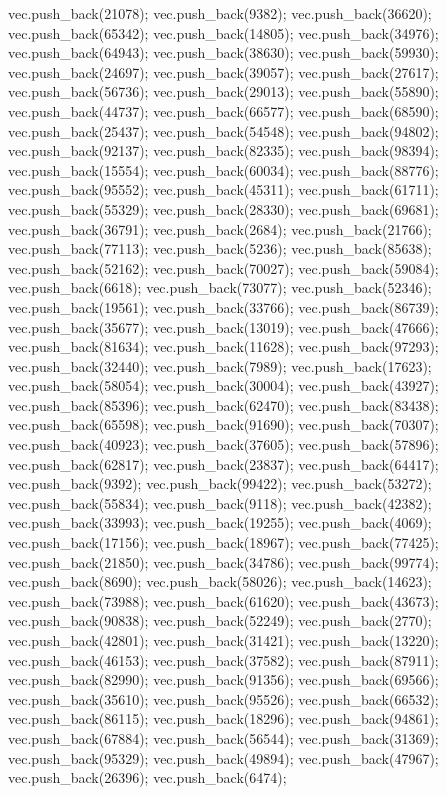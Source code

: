 vec.push_back(21078);
vec.push_back(9382);
vec.push_back(36620);
vec.push_back(65342);
vec.push_back(14805);
vec.push_back(34976);
vec.push_back(64943);
vec.push_back(38630);
vec.push_back(59930);
vec.push_back(24697);
vec.push_back(39057);
vec.push_back(27617);
vec.push_back(56736);
vec.push_back(29013);
vec.push_back(55890);
vec.push_back(44737);
vec.push_back(66577);
vec.push_back(68590);
vec.push_back(25437);
vec.push_back(54548);
vec.push_back(94802);
vec.push_back(92137);
vec.push_back(82335);
vec.push_back(98394);
vec.push_back(15554);
vec.push_back(60034);
vec.push_back(88776);
vec.push_back(95552);
vec.push_back(45311);
vec.push_back(61711);
vec.push_back(55329);
vec.push_back(28330);
vec.push_back(69681);
vec.push_back(36791);
vec.push_back(2684);
vec.push_back(21766);
vec.push_back(77113);
vec.push_back(5236);
vec.push_back(85638);
vec.push_back(52162);
vec.push_back(70027);
vec.push_back(59084);
vec.push_back(6618);
vec.push_back(73077);
vec.push_back(52346);
vec.push_back(19561);
vec.push_back(33766);
vec.push_back(86739);
vec.push_back(35677);
vec.push_back(13019);
vec.push_back(47666);
vec.push_back(81634);
vec.push_back(11628);
vec.push_back(97293);
vec.push_back(32440);
vec.push_back(7989);
vec.push_back(17623);
vec.push_back(58054);
vec.push_back(30004);
vec.push_back(43927);
vec.push_back(85396);
vec.push_back(62470);
vec.push_back(83438);
vec.push_back(65598);
vec.push_back(91690);
vec.push_back(70307);
vec.push_back(40923);
vec.push_back(37605);
vec.push_back(57896);
vec.push_back(62817);
vec.push_back(23837);
vec.push_back(64417);
vec.push_back(9392);
vec.push_back(99422);
vec.push_back(53272);
vec.push_back(55834);
vec.push_back(9118);
vec.push_back(42382);
vec.push_back(33993);
vec.push_back(19255);
vec.push_back(4069);
vec.push_back(17156);
vec.push_back(18967);
vec.push_back(77425);
vec.push_back(21850);
vec.push_back(34786);
vec.push_back(99774);
vec.push_back(8690);
vec.push_back(58026);
vec.push_back(14623);
vec.push_back(73988);
vec.push_back(61620);
vec.push_back(43673);
vec.push_back(90838);
vec.push_back(52249);
vec.push_back(2770);
vec.push_back(42801);
vec.push_back(31421);
vec.push_back(13220);
vec.push_back(46153);
vec.push_back(37582);
vec.push_back(87911);
vec.push_back(82990);
vec.push_back(91356);
vec.push_back(69566);
vec.push_back(35610);
vec.push_back(95526);
vec.push_back(66532);
vec.push_back(86115);
vec.push_back(18296);
vec.push_back(94861);
vec.push_back(67884);
vec.push_back(56544);
vec.push_back(31369);
vec.push_back(95329);
vec.push_back(49894);
vec.push_back(47967);
vec.push_back(26396);
vec.push_back(6474);
